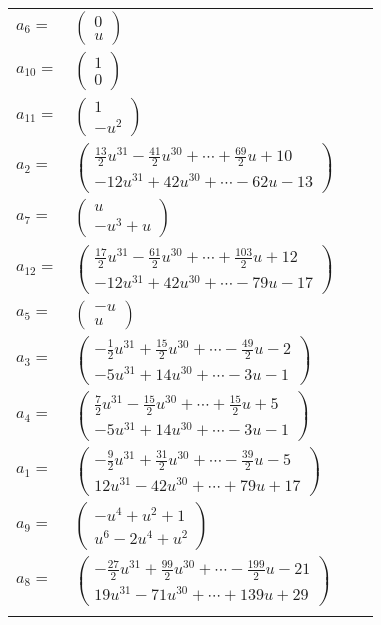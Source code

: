 \documentclass[1p]{elsarticle_modified}
\theoremstyle{definition}
\begin{document}
\begin{tabular}{m{7pt} m{180pt} m{7pt} m{180pt} }
\flushright $a_{6}=$&$\begin{pmatrix}0\\u\end{pmatrix}$ \\
\flushright $a_{10}=$&$\begin{pmatrix}1\\0\end{pmatrix}$ \\
\flushright $a_{11}=$&$\begin{pmatrix}1\\- u^2\end{pmatrix}$ \\
\flushright $a_{2}=$&$\begin{pmatrix}\frac{13}{2} u^{31}-\frac{41}{2} u^{30}+\cdots+\frac{69}{2} u+10\\-12 u^{31}+42 u^{30}+\cdots-62 u-13\end{pmatrix}$ \\
\flushright $a_{7}=$&$\begin{pmatrix}u\\- u^3+u\end{pmatrix}$ \\
\flushright $a_{12}=$&$\begin{pmatrix}\frac{17}{2} u^{31}-\frac{61}{2} u^{30}+\cdots+\frac{103}{2} u+12\\-12 u^{31}+42 u^{30}+\cdots-79 u-17\end{pmatrix}$ \\
\flushright $a_{5}=$&$\begin{pmatrix}- u\\u\end{pmatrix}$ \\
\flushright $a_{3}=$&$\begin{pmatrix}-\frac{1}{2} u^{31}+\frac{15}{2} u^{30}+\cdots-\frac{49}{2} u-2\\-5 u^{31}+14 u^{30}+\cdots-3 u-1\end{pmatrix}$ \\
\flushright $a_{4}=$&$\begin{pmatrix}\frac{7}{2} u^{31}-\frac{15}{2} u^{30}+\cdots+\frac{15}{2} u+5\\-5 u^{31}+14 u^{30}+\cdots-3 u-1\end{pmatrix}$ \\
\flushright $a_{1}=$&$\begin{pmatrix}-\frac{9}{2} u^{31}+\frac{31}{2} u^{30}+\cdots-\frac{39}{2} u-5\\12 u^{31}-42 u^{30}+\cdots+79 u+17\end{pmatrix}$ \\
\flushright $a_{9}=$&$\begin{pmatrix}- u^4+u^2+1\\u^6-2 u^4+u^2\end{pmatrix}$ \\
\flushright $a_{8}=$&$\begin{pmatrix}-\frac{27}{2} u^{31}+\frac{99}{2} u^{30}+\cdots-\frac{199}{2} u-21\\19 u^{31}-71 u^{30}+\cdots+139 u+29\end{pmatrix}$\\&\end{tabular}
\end{document}
